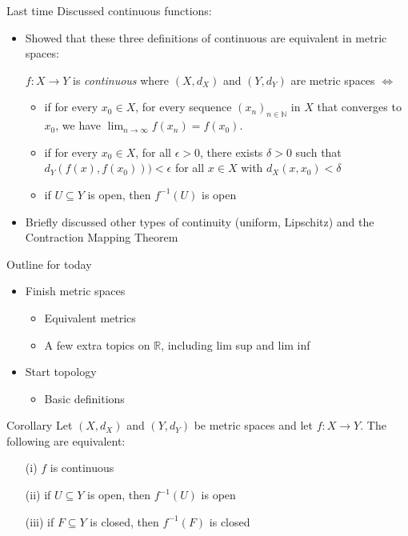 \documentclass [aspectratio=169]{beamer}
\newcommand{\R}{{\mathbb{R}}}
\newcommand{\N}{{\mathbb{N}}}
\newcommand{\inv}{{-1}}
\begin{document}
\begin{frame}{Last time}
Discussed continuous functions:
 \vspace{0.5em}
	\begin{itemize}
	\setlength\itemsep{0.7em}
	\item Showed that these three definitions of continuous are equivalent in metric spaces: \\
	\vspace{0.5em}
	
	$f:X \to Y$ is \emph{continuous} where $(X,d_X)$ and $(Y,d_Y)$ are metric spaces $\Leftrightarrow$
	\begin{itemize}
	\setlength\itemsep{0.4em}
		\item  if for every $x_0 \in X$, for every sequence $(x_n)_{n\in\N}$ in $X$ that converges to $x_0$, we have $\lim_{n\to\infty}f(x_n)=f(x_0)$.
		\item   if for every $x_0 \in X$, for all $\epsilon>0$, there exists $\delta > 0$ such that $d_Y(f(x),f(x_0))) < \epsilon$ for all $x \in X$ with $d_X(x,x_0) < \delta$
		\item if $U \subseteq Y$ is open, then $f^\inv(U)$ is open
	\end{itemize}
	\item Briefly discussed other types of continuity (uniform, Lipschitz) and the Contraction Mapping Theorem
	\end{itemize}
\end{frame}

\begin{frame}{Outline for today}
    \begin{itemize}
      \setlength\itemsep{1em}
    	\item Finish metric spaces
	\begin{itemize}
	\setlength\itemsep{0.3em}
	\item Equivalent metrics
	\item A few extra topics on $\R$, including lim sup and lim inf
	\end{itemize}
	\item Start topology
	\begin{itemize}
	\setlength\itemsep{0.3em}
	\item Basic definitions
	\end{itemize}
    \end{itemize}
\end{frame}

\begin{frame}
\begin{exampleblock}{Corollary}
Let $(X,d_X)$ and $(Y,d_Y)$ be metric spaces and let $f:X\to Y$. The following are equivalent:
\begin{enumerate}
    \item[(i)] $f$ is continuous
    \item[(ii)] if $U \subseteq Y$ is open, then $f^\inv(U)$ is open
    \item[(iii)] if $F \subseteq Y$ is closed, then $f^\inv(F)$ is closed
\end{enumerate}
\end{exampleblock}

\end{frame}
\end{document}
